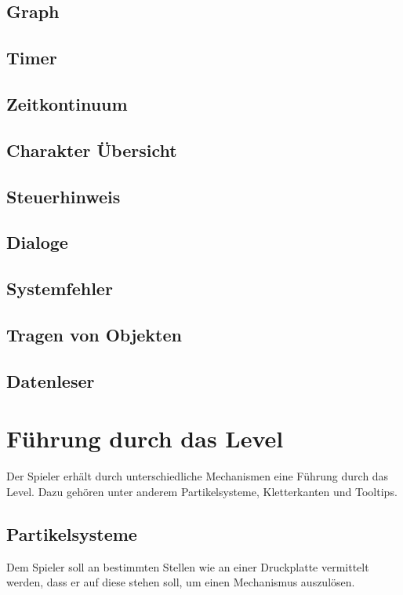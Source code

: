 \subsection{Graph}
\subsection{Timer}\label{sec:user_timer}
\subsection{Zeitkontinuum}\label{sec:kontinuum_ui}
\subsection{Charakter Übersicht}\label{sec:character-overview}
\subsection{Steuerhinweis}
\subsection{Dialoge}
\subsection{Systemfehler}
\subsection{Tragen von Objekten}
\subsection{Datenleser}\label{sec:datenleser_ui}
\section{Führung durch das Level}
Der Spieler erhält durch unterschiedliche Mechanismen eine Führung durch das Level. Dazu gehören unter anderem Partikelsysteme, Kletterkanten und Tooltips.
\subsection{Partikelsysteme}\label{sec:particle-system}
Dem Spieler soll an bestimmten Stellen wie an einer Druckplatte vermittelt werden, dass er auf diese stehen soll, um einen Mechanismus auszulösen.

